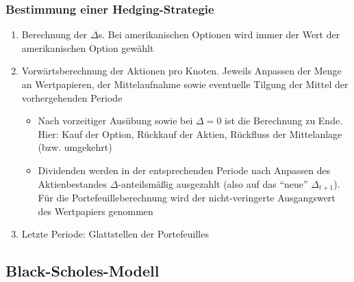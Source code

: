 \subsubsection{Bestimmung einer Hedging-Strategie}
\begin{enumerate}
	\item Berechnung der \(\Delta\)s. Bei amerikanischen Optionen wird immer der Wert der amerikanischen Option gewählt
	\item Vorwärtsberechnung der Aktionen pro Knoten. Jeweils Anpassen der Menge an Wertpapieren, der Mittelaufnahme sowie eventuelle Tilgung der Mittel der vorhergehenden Periode
	\begin{itemize}
		\item Nach vorzeitiger Ausübung sowie bei \(\Delta=0\) ist die Berechnung zu Ende. Hier: Kauf der Option, Rückkauf der Aktien, Rückfluss der Mittelanlage (bzw. umgekehrt)
		\item Dividenden werden in der entsprechenden Periode nach Anpassen des Aktienbestandes \(\Delta\)-anteilsmäßig ausgezahlt (also auf das "`neue"' \(\Delta_{t+1}\)). Für die Portefeuilleberechnung wird der nicht-veringerte Ausgangswert des Wertpapiers genommen
	\end{itemize}
	\item Letzte Periode: Glattstellen der Portefeuilles
\end{enumerate}


\subsection{Black-Scholes-Modell}


